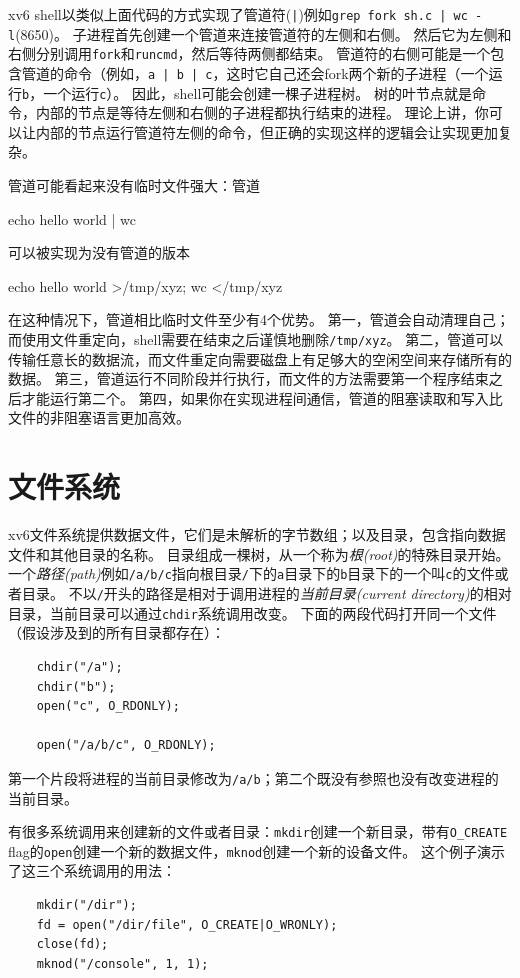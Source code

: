 xv6 shell以类似上面代码的方式实现了管道符(\texttt{|})例如\texttt{grep fork sh.c | wc -l}(8650)。
子进程首先创建一个管道来连接管道符的左侧和右侧。
然后它为左侧和右侧分别调用\texttt{fork}和\texttt{runcmd}，然后等待两侧都结束。
管道符的右侧可能是一个包含管道的命令（例如，\texttt{a | b | c}，这时它自己还会fork两个新的子进程（一个运行\texttt{b}，一个运行\texttt{c}）。
因此，shell可能会创建一棵子进程树。
树的叶节点就是命令，内部的节点是等待左侧和右侧的子进程都执行结束的进程。
理论上讲，你可以让内部的节点运行管道符左侧的命令，但正确的实现这样的逻辑会让实现更加复杂。

管道可能看起来没有临时文件强大：管道
\begin{blacklisting}
    echo hello world | wc    
\end{blacklisting}
可以被实现为没有管道的版本
\begin{blacklisting}
    echo hello world >/tmp/xyz; wc </tmp/xyz
\end{blacklisting}

在这种情况下，管道相比临时文件至少有4个优势。
第一，管道会自动清理自己；而使用文件重定向，shell需要在结束之后谨慎地删除\texttt{/tmp/xyz}。
第二，管道可以传输任意长的数据流，而文件重定向需要磁盘上有足够大的空闲空间来存储所有的数据。
第三，管道运行不同阶段并行执行，而文件的方法需要第一个程序结束之后才能运行第二个。
第四，如果你在实现进程间通信，管道的阻塞读取和写入比文件的非阻塞语言更加高效。

\section*{文件系统}
xv6文件系统提供数据文件，它们是未解析的字节数组；以及目录，包含指向数据文件和其他目录的名称。
目录组成一棵树，从一个称为\emph{根(root)}的特殊目录开始。
一个\emph{路径(path)}例如\texttt{/a/b/c}指向根目录\texttt{/}下的\texttt{a}目录下的\texttt{b}目录下的一个叫\texttt{c}的文件或者目录。
不以\texttt{/}开头的路径是相对于调用进程的\emph{当前目录(current directory)}的相对目录，当前目录可以通过\texttt{chdir}系统调用改变。
下面的两段代码打开同一个文件（假设涉及到的所有目录都存在）：
\begin{lstlisting}
    chdir("/a");
    chdir("b");
    open("c", O_RDONLY);

    open("/a/b/c", O_RDONLY);
\end{lstlisting}
第一个片段将进程的当前目录修改为\texttt{/a/b}；第二个既没有参照也没有改变进程的当前目录。

有很多系统调用来创建新的文件或者目录：\texttt{mkdir}创建一个新目录，带有\texttt{O\_CREATE} flag的\texttt{open}创建一个新的数据文件，\texttt{mknod}创建一个新的设备文件。
这个例子演示了这三个系统调用的用法：
\begin{lstlisting}
    mkdir("/dir");
    fd = open("/dir/file", O_CREATE|O_WRONLY);
    close(fd);
    mknod("/console", 1, 1);
\end{lstlisting}

